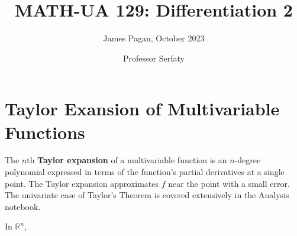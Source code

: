\documentclass[11pt]{article}
\title{MATH-UA 129: Differentiation 2}
\author{James Pagan, October 2023}
\date{Professor Serfaty}
\begin{document}
\maketitle
\tableofcontents


\section{Taylor Exansion of Multivariable Functions}

The $n$th \textbf{Taylor expansion} of a multivariable function is an $n$-degree polynomial expressed in terms of the function's partial derivatives at a single point. The Taylor expansion approximates $f$ near the point with a small error. The univariate case of Taylor's Theorem is covered extensively in the Analysis notebook.

In $\mathbb{R}^{n}$,

\end{document}
